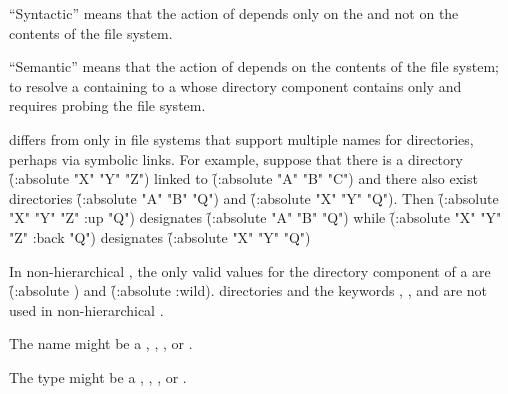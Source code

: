 ``Syntactic'' means that the action of  
depends only on the 
and not on the contents of the file system.  

``Semantic'' means that the action of  
depends on the contents of the file system; 
to resolve a  containing 
 to a  whose directory component
contains only  and 
 requires probing the file system.

 differs from 
 only in file systems that support multiple
  names for directories, perhaps via symbolic links.  For example,
  suppose that there is a directory
\f{(:absolute "X" "Y" "Z")}
  linked to 
\f{(:absolute "A" "B" "C")}
  and there also exist directories
\f{(:absolute "A" "B" "Q")} and 
\f{(:absolute "X" "Y" "Q")}.
Then
\f{(:absolute "X" "Y" "Z" :up "Q")}
  designates
\f{(:absolute "A" "B" "Q")}
  while
\f{(:absolute "X" "Y" "Z" :back "Q")}
  designates
\f{(:absolute "X" "Y" "Q")}
\endlist 



In non-hierarchical ,
the only valid  values for the directory component of a 
are \f{(:absolute )} and \f{(:absolute :wild)}.
 directories and the keywords
, , and  are not used 
in non-hierarchical .

\endsubsubsubsubsection%

\endsubsubsubsection%


The name might be a ,
, , or \nil.

\endsubsubsubsection%


The type might be a ,
, , or \nil.

